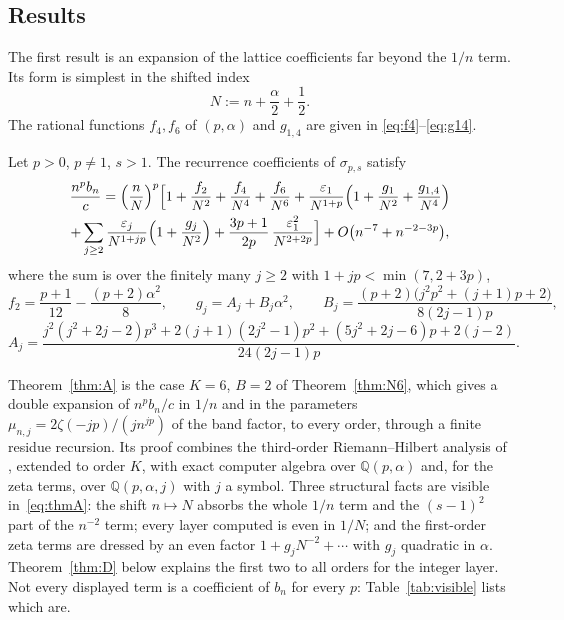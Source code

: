 \subsection{Results}\label{sec:results}
The first result is an expansion of the lattice coefficients far beyond the $1/n$ term. Its form is simplest in the
shifted index
\begin{equation}\label{eq:N}
  N:=n+\frac\alpha2+\frac12 .
\end{equation}
The rational functions $f_4,f_6$ of $(p,\alpha)$ and $g_{1,4}$ are given in \eqref{eq:f4}--\eqref{eq:g14}.

\begin{mainthm}\label{thm:A}
Let $p>0$, $p\ne1$, $s>1$. The recurrence coefficients of $\sigma_{p,s}$ satisfy
\begin{multline}\label{eq:thmA}
  \frac{n^pb_n}{c}=\Bigl(\frac nN\Bigr)^p\Bigl[1+\frac{f_2}{N^2}+\frac{f_4}{N^4}+\frac{f_6}{N^6}
  +\frac{\varepsilon_1}{N^{1+p}}\Bigl(1+\frac{g_1}{N^2}+\frac{g_{1,4}}{N^4}\Bigr)\\
  +\sum_{j\ge2}\frac{\varepsilon_j}{N^{1+jp}}\Bigl(1+\frac{g_j}{N^2}\Bigr)
  +\frac{3p+1}{2p}\,\frac{\varepsilon_1^2}{N^{2+2p}}\Bigr]
  +O\bigl(n^{-7}+n^{-2-3p}\bigr),
\end{multline}
where the sum is over the finitely many $j\ge2$ with $1+jp<\min(7,2+3p)$,
\[
  f_2=\frac{p+1}{12}-\frac{(p+2)\alpha^2}{8},\qquad g_j=A_j+B_j\alpha^2,\qquad
  B_j=\frac{(p+2)\bigl(j^2p^2+(j+1)p+2\bigr)}{8(2j-1)p},
\]
\[
  A_j=\frac{j^2(j^2+2j-2)p^3+2(j+1)(2j^2-1)p^2+(5j^2+2j-6)p+2(j-2)}{24(2j-1)p}.
\]
\end{mainthm}

Theorem~\ref{thm:A} is the case $K=6$, $B=2$ of Theorem~\ref{thm:N6}, which gives a double expansion of
$n^pb_n/c$ in $1/n$ and in the parameters $\mu_{n,j}=2\zeta(-jp)/(jn^{jp})$ of the band factor, to every order, through
a finite residue recursion. Its proof combines the third-order Riemann--Hilbert analysis of \cite{PaperII}, extended
to order $K$, with exact computer algebra over $\mathbb Q(p,\alpha)$ and, for the zeta terms, over
$\mathbb Q(p,\alpha,j)$ with $j$ a symbol. Three structural facts are visible in~\eqref{eq:thmA}: the shift
$n\mapsto N$ absorbs the whole $1/n$ term and the $(s-1)^2$ part of the $n^{-2}$ term; every layer computed is even in
$1/N$; and the first-order zeta terms are dressed by an even factor $1+g_jN^{-2}+\dotsb$ with $g_j$ quadratic in $\alpha$.
Theorem~\ref{thm:D} below explains the first two to all orders for the integer layer.
Not every displayed term is a coefficient of $b_n$ for every $p$: Table~\ref{tab:visible} lists which are.

